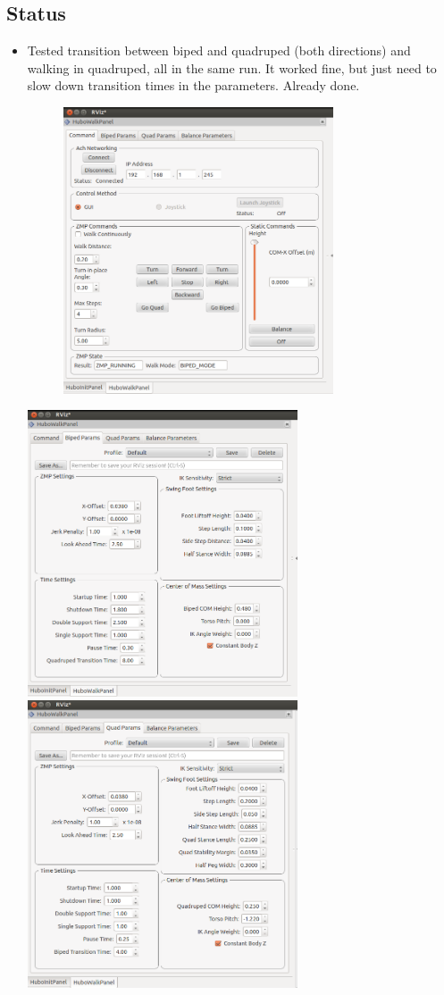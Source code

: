 \documentclass[letterpaper, 10 pt]{report}
\begin{document}
\subsection*{Status}
\begin{itemize}
\item Tested transition between biped and quadruped (both directions) and walking in quadruped, all in the same run. It worked fine, but just need to slow down transition times in the parameters. Already done.
\newline
\begin{figure}[h]
\centering
\includegraphics[width=8.0cm]{resources/HuboWalkPanel01}
\end{figure}
\newline
\includegraphics[width=8.0cm]{resources/BipedParams01}
\includegraphics[width=8.0cm]{resources/QuadParams01}
\end{itemize}
\end{document}
